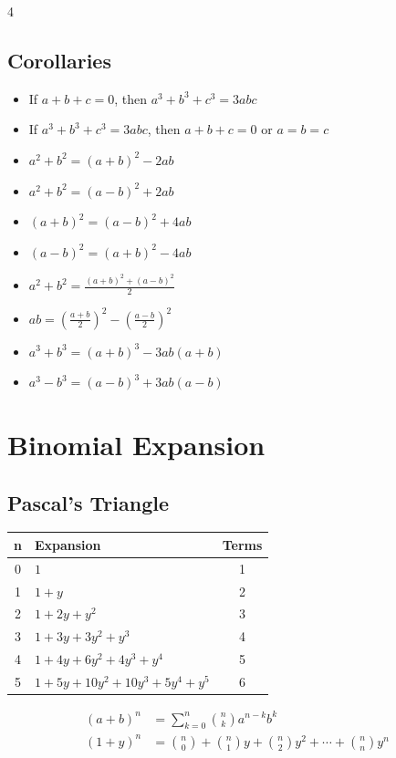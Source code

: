 \begin{multicols*}{4}
\subsection*{ Corollaries}
\begin{itemize}
    \item  If $a + b + c = 0$, then $a^3 + b^3 + c^3 = 3abc$
    \item  If $a^3 + b^3 + c^3 = 3abc$, then $a + b + c = 0$ or $a = b = c$
    \item  $a^2 + b^2 = (a + b)^2 - 2ab$
    \item  $a^2 + b^2 = (a - b)^2 + 2ab$
    \item  $(a + b)^2 = (a - b)^2 + 4ab$
    \item  $(a - b)^2 = (a + b)^2 - 4ab$
    \item  $a^2 + b^2 = \frac{(a + b)^2 + (a - b)^2}{2}$
    \item  $ab = \left(\frac{a + b}{2}\right)^2 - \left(\frac{a - b}{2}\right)^2$
    \item  $a^3 + b^3 = (a + b)^3 - 3ab(a + b)$
    \item  $a^3 - b^3 = (a - b)^3 + 3ab(a - b)$
\end{itemize}


\section*{Binomial Expansion}
\subsection*{ Pascal's Triangle}

\scriptsize %
\begin{tabular}{@{}clc@{}}
\toprule
\textbf{n} & \textbf{Expansion} & \textbf{Terms} \\
\midrule
0 & \(1\) & 1 \\
1 & \(1 + y\) & 2 \\
2 & \(1 + 2y + y^2\) & 3 \\
3 & \(1 + 3y + 3y^2 + y^3\) & 4 \\
4 & \(1 + 4y + 6y^2 + 4y^3 + y^4\) & 5 \\
5 & \(1 + 5y + 10y^2 + 10y^3 + 5y^4 + y^5\) & 6 \\
\bottomrule
\end{tabular}
\raggedright

\begin{align*}
(a + b)^n &= \sum_{k=0}^{n} \binom{n}{k} a^{n-k} b^k \\
(1 + y)^n &= \binom{n}{0} + \binom{n}{1}y + \binom{n}{2}y^2 + \cdots + \binom{n}{n}y^n
\end{align*}


\end{multicols*}
